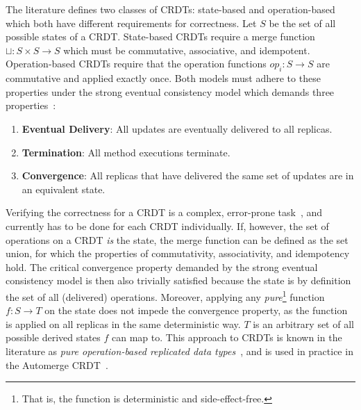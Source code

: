 


The literature defines two classes of CRDTs: state-based and operation-based
which both have different requirements for correctness.
Let \( S \) be the set of all possible states of a CRDT.
State-based CRDTs require a merge function \( \sqcup: S \times S \to S \)
which must be commutative, associative, and idempotent.
Operation-based CRDTs require that the operation functions \( op_i: S \to S \)
are commutative and applied exactly once.
Both models must adhere to these properties under the strong eventual consistency
model which demands three properties~\cite{shapiro2011comprehensive}:

\begin{enumerate}
	\item \textbf{Eventual Delivery}: All updates are eventually delivered to
	      all replicas.
	\item \textbf{Termination}: All method executions terminate.
	\item \textbf{Convergence}: All replicas that have delivered the same set of
	      updates are in an equivalent state.
\end{enumerate}

Verifying the correctness for a CRDT is a complex,
error-prone task~\cite{gomes2017verifying, kleppmann2022assessing},
and currently has to be done for each CRDT individually.
If, however, the set of operations on a CRDT \emph{is} the state,
the merge function can be defined as the set union,
for which the properties of commutativity, associativity, and idempotency hold.
The critical convergence property demanded by the strong eventual consistency
model is then also trivially satisfied because the state is by definition
the set of all (delivered) operations.
Moreover, applying any \emph{pure}\footnote{
	That is, the function is deterministic and side-effect-free.
}
function \( f: S \to T \) on the state does not impede the convergence property,
as the function is applied on all replicas in the same deterministic way.
\( T \) is an arbitrary set of all possible derived states \( f \) can map to.
This approach to CRDTs is known in the literature as
\emph{pure operation-based replicated data types}~\cite{baquero2017pure, stewen2024undo},
and is used in practice in the Automerge CRDT~\cite{automerge}.

